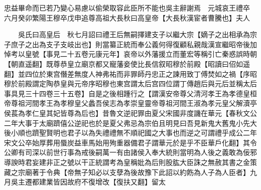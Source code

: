 忠益畢命而已若乃變心易慮以偷榮取容此臣所不能也吳主辭謝焉　元城哀王禮卒　六月癸卯繁陽王穆卒戊申追尊高祖大長秋曰高皇帝【大長秋漢宦者曹騰也】夫人

　　吳氏曰高皇后　秋七月詔曰禮王后無嗣擇建支子以繼大宗【嫡子之出相承為宗子庶子之出為支子支岐出也】則當纂正統而奉公義何得復顧私親哉漢宣繼昭帝後加悼考以皇號【事見二十五卷元康元年】哀帝以外藩援立而董宏等稱引亡秦惑誤時朝【朝直遥翻】既尊恭皇立廟京都又寵藩妾使比長信叙昭穆於前殿【昭讀曰佋如遥翻】並四位於東宫僭差無度人神弗祐而非罪師丹忠正之諫用致丁傅焚如之禍【序昭穆於前殿謂定陶恭皇與元帝序昭穆也東宫謂太后宫四位謂丁傳趙后與元后並稱太后事具見三十四卷三十五卷】自是之後相踵行之【謂漢安帝尊父清河孝王為孝德皇桓帝尊祖河間孝王為孝穆皇父蠡吾侯志為孝崇皇靈帝尊祖河間王淑為孝元皇父解瀆亭侯萇為孝仁皇其妃皆尊為后也】昔魯文逆祀罪由夏父宋國非度譏在華元【春秋文公二年大事于太廟躋僖公逆祀也於是夏父弗忌為宗伯且明見曰吾見新鬼大舊鬼小先大後小順也躋聖賢明也君子以為失禮禮無不順祀國之大事也而逆之可謂禮乎成公二年宋文公卒始厚葬用蜃炭益車馬始用殉重器備君子謂華元於是乎不臣華戶化翻】其令公卿有司深以前世行事為戒後嗣萬一有由諸侯入奉大統則當明為人後之義敢為佞邪導諛時君妄建非正之號以干正統謂考為皇稱妣為后則股肱大臣誅之無赦其書之金策藏之宗廟著于令典【帝無子知必以支孽為後故豫下此詔以約飭為人子為人臣者】九月吳主遷都建業皆因故府不復增改【復扶又翻】留太

